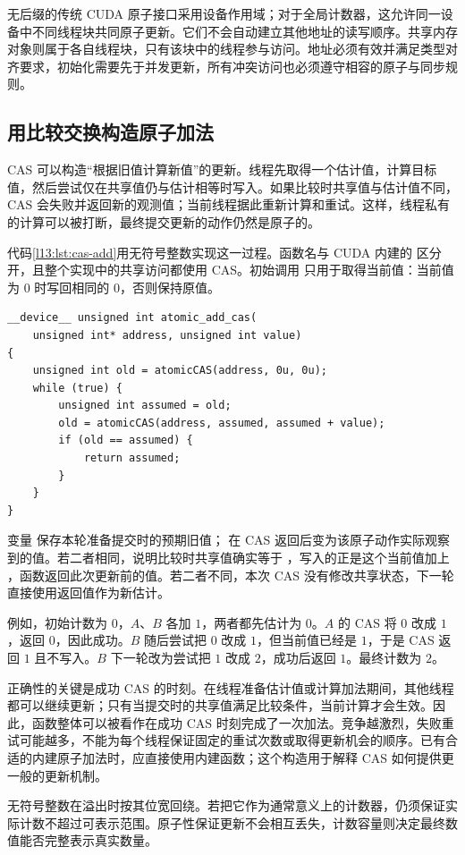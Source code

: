 无后缀的传统 CUDA 原子接口采用设备作用域；对于全局计数器，这允许同一设备中不同线程块共同原子更新。它们不会自动建立其他地址的读写顺序。共享内存对象则属于各自线程块，只有该块中的线程参与访问。地址必须有效并满足类型对齐要求，初始化需要先于并发更新，所有冲突访问也必须遵守相容的原子与同步规则。

\subsection{用比较交换构造原子加法}

CAS 可以构造“根据旧值计算新值”的更新。线程先取得一个估计值，计算目标值，然后尝试仅在共享值仍与估计相等时写入。如果比较时共享值与估计值不同，CAS 会失败并返回新的观测值；当前线程据此重新计算和重试。这样，线程私有的计算可以被打断，最终提交更新的动作仍然是原子的。

代码\ref{l13:lst:cas-add}用无符号整数实现这一过程。函数名与 CUDA 内建的 \mbox{} 区分开，且整个实现中的共享访问都使用 CAS。初始调用 \mbox{} 只用于取得当前值：当前值为 $0$ 时写回相同的 $0$，否则保持原值。

\noindent\begin{minipage}{\textwidth}
\begin{lstlisting}[caption={由 CAS 构造无符号整数原子加法},label={l13:lst:cas-add}]
__device__ unsigned int atomic_add_cas(
    unsigned int* address, unsigned int value)
{
    unsigned int old = atomicCAS(address, 0u, 0u);
    while (true) {
        unsigned int assumed = old;
        old = atomicCAS(address, assumed, assumed + value);
        if (old == assumed) {
            return assumed;
        }
    }
}
\end{lstlisting}
\end{minipage}

变量 \mbox{} 保存本轮准备提交时的预期旧值；\mbox{} 在 CAS 返回后变为该原子动作实际观察到的值。若二者相同，说明比较时共享值确实等于 \mbox{}，写入的正是这个当前值加上 \mbox{}，函数返回此次更新前的值。若二者不同，本次 CAS 没有修改共享状态，下一轮直接使用返回值作为新估计。

例如，初始计数为 $0$，$A$、$B$ 各加 $1$，两者都先估计为 $0$。$A$ 的 CAS 将 $0$ 改成 $1$，返回 $0$，因此成功。$B$ 随后尝试把 $0$ 改成 $1$，但当前值已经是 $1$，于是 CAS 返回 $1$ 且不写入。$B$ 下一轮改为尝试把 $1$ 改成 $2$，成功后返回 $1$。最终计数为 $2$。

正确性的关键是成功 CAS 的时刻。在线程准备估计值或计算加法期间，其他线程都可以继续更新；只有当提交时的共享值满足比较条件，当前计算才会生效。因此，函数整体可以被看作在成功 CAS 时刻完成了一次加法。竞争越激烈，失败重试可能越多，不能为每个线程保证固定的重试次数或取得更新机会的顺序。已有合适的内建原子加法时，应直接使用内建函数；这个构造用于解释 CAS 如何提供更一般的更新机制。

无符号整数在溢出时按其位宽回绕。若把它作为通常意义上的计数器，仍须保证实际计数不超过可表示范围。原子性保证更新不会相互丢失，计数容量则决定最终数值能否完整表示真实数量。
